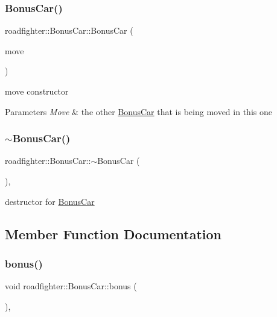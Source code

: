 \subsubsection{\texorpdfstring{Bonus\+Car()}{BonusCar()}\hspace{0.1cm}{\footnotesize\ttfamily [3/3]}}
{\footnotesize\ttfamily roadfighter\+::\+Bonus\+Car\+::\+Bonus\+Car (\begin{DoxyParamCaption}\item[{\hyperlink{classroadfighter_1_1BonusCar}{Bonus\+Car} \&\&}]{move }\end{DoxyParamCaption})\hspace{0.3cm}{\ttfamily [default]}}

move constructor 
\begin{DoxyParams}{Parameters}
{\em Move} & the other \hyperlink{classroadfighter_1_1BonusCar}{Bonus\+Car} that is being moved in this one \\
\hline
\end{DoxyParams}
\mbox{\label{classroadfighter_1_1BonusCar_a055742bdc09217d56c34c7f582cf7670}} 
\subsubsection{\texorpdfstring{$\sim$\+Bonus\+Car()}{~BonusCar()}}
{\footnotesize\ttfamily roadfighter\+::\+Bonus\+Car\+::$\sim$\+Bonus\+Car (\begin{DoxyParamCaption}{ }\end{DoxyParamCaption})\hspace{0.3cm}{\ttfamily [override]}, {\ttfamily [default]}}

destructor for \hyperlink{classroadfighter_1_1BonusCar}{Bonus\+Car} 

\subsection{Member Function Documentation}
\mbox{\label{classroadfighter_1_1BonusCar_a3d2d15df036c419cd9ad4fbc6fcd4ad9}} 
\subsubsection{\texorpdfstring{bonus()}{bonus()}}
{\footnotesize\ttfamily void roadfighter\+::\+Bonus\+Car\+::bonus (\begin{DoxyParamCaption}{ }\end{DoxyParamCaption})\hspace{0.3cm}{\ttfamily [override]}, {\ttfamily [virtual]}}


